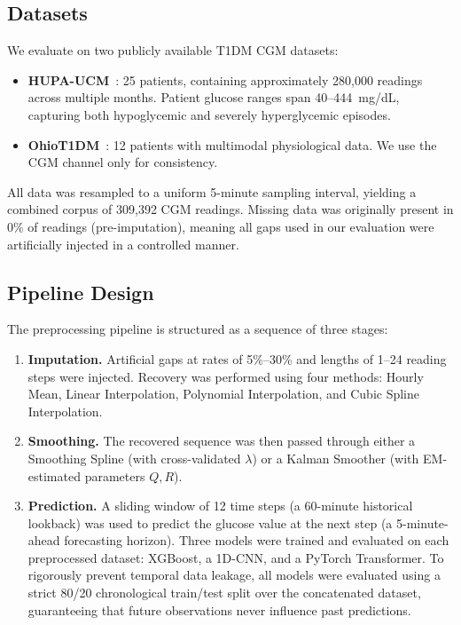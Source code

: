 \documentclass[pmlr,twocolumn,10pt]{jmlr} %
\begin{document}
\subsection{Datasets}
We evaluate on two publicly available T1DM CGM datasets:
\begin{itemize}[nosep]
    \item \textbf{HUPA-UCM}~\citep{rojas2019hupa}: 25 patients, containing approximately 280,000 readings across multiple months. Patient glucose ranges span 40--444~mg/dL, capturing both hypoglycemic and severely hyperglycemic episodes.
    \item \textbf{OhioT1DM}~\citep{marling2020ohiot1dm}: 12 patients with multimodal physiological data. We use the CGM channel only for consistency.
\end{itemize}
All data was resampled to a uniform 5-minute sampling interval, yielding a combined corpus of 309,392 CGM readings. Missing data was originally present in 0\% of readings (pre-imputation), meaning all gaps used in our evaluation were artificially injected in a controlled manner.

\subsection{Pipeline Design}
The preprocessing pipeline is structured as a sequence of three stages:

\begin{enumerate}[label=\textbf{Stage~\arabic*:}, leftmargin=*, nosep]
    \item \textbf{Imputation.} Artificial gaps at rates of 5\%--30\% and lengths of 1--24 reading steps were injected. Recovery was performed using four methods: Hourly Mean, Linear Interpolation, Polynomial Interpolation, and Cubic Spline Interpolation.
    \item \textbf{Smoothing.} The recovered sequence was then passed through either a Smoothing Spline (with cross-validated $\lambda$) or a Kalman Smoother (with EM-estimated parameters $Q, R$).
    \item \textbf{Prediction.} A sliding window of 12 time steps (a 60-minute historical lookback) was used to predict the glucose value at the next step (a 5-minute-ahead forecasting horizon). Three models were trained and evaluated on each preprocessed dataset: XGBoost, a 1D-CNN, and a PyTorch Transformer. To rigorously prevent temporal data leakage, all models were evaluated using a strict 80/20 chronological train/test split over the concatenated dataset, guaranteeing that future observations never influence past predictions.
\end{enumerate}
\end{document}
